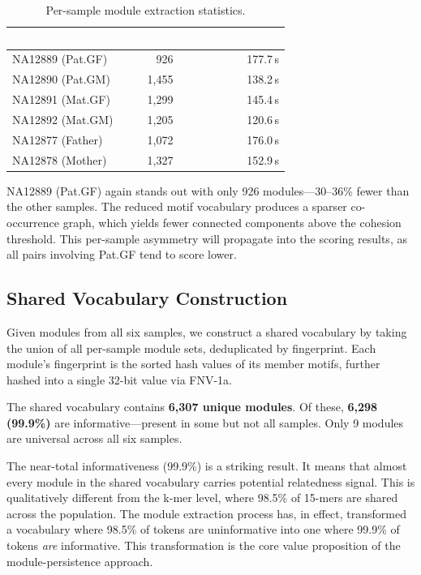 \documentclass{../yalumba}
\begin{document}
\begin{table}[H]
\centering
\tablestyle
\caption{Per-sample module extraction statistics.}
\label{tab:modules}
\begin{tabular}{@{}lrr@{}}
\toprule
\rowcolor{table-header}
\textcolor{white}{\textbf{Sample}} &
\textcolor{white}{\textbf{Modules}} &
\textcolor{white}{\textbf{Extraction Time}} \\
\midrule
NA12889 (Pat.GF) &   926 & 177.7\,s \\
NA12890 (Pat.GM) & 1{,}455 & 138.2\,s \\
NA12891 (Mat.GF) & 1{,}299 & 145.4\,s \\
NA12892 (Mat.GM) & 1{,}205 & 120.6\,s \\
NA12877 (Father) & 1{,}072 & 176.0\,s \\
NA12878 (Mother) & 1{,}327 & 152.9\,s \\
\bottomrule
\end{tabular}
\end{table}

NA12889 (Pat.GF) again stands out with only 926 modules---30--36\% fewer
than the other samples.  The reduced motif vocabulary produces a sparser
co-occurrence graph, which yields fewer connected components above the
cohesion threshold.  This per-sample asymmetry will propagate into the
scoring results, as all pairs involving Pat.GF tend to score lower.

\subsection{Shared Vocabulary Construction}

Given modules from all six samples, we construct a shared vocabulary by
taking the union of all per-sample module sets, deduplicated by fingerprint.
Each module's fingerprint is the sorted hash values of its member motifs,
further hashed into a single 32-bit value via FNV-1a.

\begin{keyfinding}
The shared vocabulary contains \textbf{6{,}307 unique modules}.  Of these,
\textbf{6{,}298 (99.9\%)} are informative---present in some but not all
samples.  Only 9 modules are universal across all six samples.
\end{keyfinding}

The near-total informativeness (99.9\%) is a striking result.  It means that
almost every module in the shared vocabulary carries potential relatedness
signal.  This is qualitatively different from the k-mer level, where 98.5\%
of 15-mers are shared across the population.  The module extraction process
has, in effect, transformed a vocabulary where 98.5\% of tokens are
uninformative into one where 99.9\% of tokens \emph{are} informative.  This
transformation is the core value proposition of the module-persistence
approach.
\end{document}
